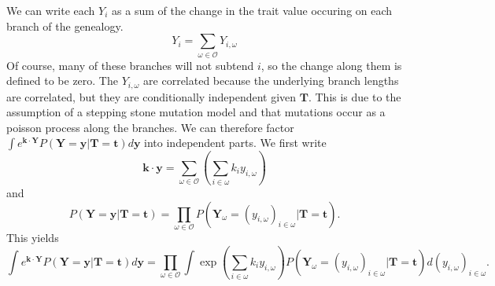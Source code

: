 We can write each $Y_i$ as a sum of the change in the trait value
occuring on each branch of the genealogy.
\begin{equation}
  Y_i = \sum_{\omega \in \mathcal{O}} Y_{i,\omega}
\end{equation}
Of course, many of these branches will not subtend $i$, so the change
along them is defined to be zero. The $Y_{i,\omega}$ are correlated
because the underlying branch lengths are correlated, but they are
conditionally independent given $\mathbf{T}$. This is due to the
assumption of a stepping stone mutation model and that mutations occur
as a poisson process along the branches. We can therefore factor $\int
e^{\mathbf{k} \cdot \mathbf{Y}} P(\mathbf{Y}=\mathbf{y}
|\mathbf{T}=\mathbf{t}) d\mathbf{y}$ into independent parts. We first write
\begin{equation}
  \mathbf{k} \cdot \mathbf{y} = \sum_{\omega \in \mathcal{O}}\left( \sum_{i \in \omega} k_iy_{i,\omega}\right)
\end{equation}
and
\begin{equation}
  P(\mathbf{Y}=\mathbf{y}|\mathbf{T}=\mathbf{t}) = \prod_{\omega \in \mathcal{O}}
  P(\mathbf{Y}_{\omega}=(y_{i,\omega})_{i \in \omega} | \mathbf{T}=\mathbf{t}).
\end{equation}
This yields
\begin{equation} \label{eq:factor}
  \int e^{\mathbf{k} \cdot \mathbf{Y}} P(\mathbf{Y}=\mathbf{y} |\mathbf{T}=\mathbf{t}) d\mathbf{y} =
  \prod_{\omega \in \mathcal{O}}\int \exp\left(\sum_{i \in \omega}k_iy_{i,\omega}\right)
  P(\mathbf{Y}_{\omega}=(y_{i,\omega})_{i \in \omega} | \mathbf{T}=\mathbf{t})d(y_{i,\omega})_{i \in \omega}.
\end{equation}

